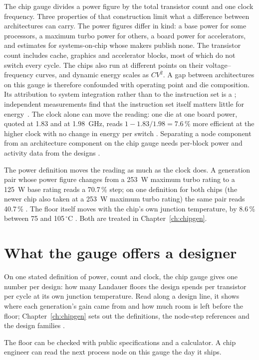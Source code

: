 The chip gauge divides a power figure by the total transistor count and one clock frequency. Three properties of that
construction limit what a difference between architectures can carry. The power figures differ in kind: a base power
for some processors, a maximum turbo power for others, a board power for accelerators, and estimates for systems-on-chip
whose makers publish none. The transistor count includes cache, graphics and accelerator blocks, most of which do not
switch every cycle. The chips also run at different points on their voltage--frequency curves, and dynamic energy
scales as $CV^2$. A gap between architectures on this gauge is therefore confounded with operating point and die
composition. Its attribution to system integration rather than to the instruction set is a \conjecture; independent
measurements find that the instruction set itself matters little for energy~\cite{Blem2013}. The clock alone can move
the reading: one die at one board power, quoted at 1.83 and at 1.98~GHz, reads $1-1.83/1.98=7.6\,\%$ more efficient
at the higher clock with no change in energy per switch \calc.
Separating a node component from an architecture component on the chip gauge needs per-block power and activity data from
the designs \openprob.

\noindent The power definition moves the reading as much as the clock does. A generation pair whose power figure changes from a 253~W maximum
turbo rating to a 125~W base rating reads a 70.7\,\% step; on one definition for both chips (the newer chip also taken at a 253~W maximum turbo rating) the same pair reads 40.7\,\% \calc. The floor itself
moves with the chip's own junction temperature, by 8.6\,\% between 75 and 105\,$^\circ$C \calc. Both are treated in Chapter~\ref{ch:chipgen}.

\section{What the gauge offers a designer}
On one stated definition of power, count and clock, the chip gauge gives one number per design: how many Landauer floors the design spends per
transistor per cycle at its own junction temperature. Read along a design line, it shows where each generation's gain came from and how much
room is left before the floor; Chapter~\ref{ch:chipgen} sets out the definitions, the node-step references and the design families \interp.

The floor can be checked with public specifications and a calculator. A chip engineer can read the next process node on this gauge the day it ships.
